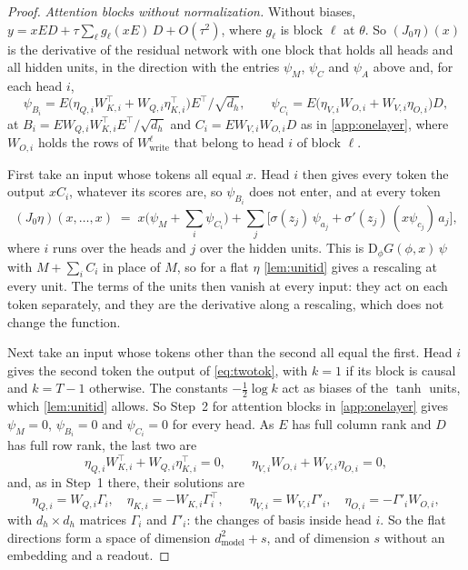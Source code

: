 \documentclass[10pt]{article}
\theoremstyle{definition}
\theoremstyle{remark}
\newcommand{\Wwrite}{W_{\mathrm{write}}}
\newcommand{\dm}{d_{\mathrm{model}}}
\newcommand{\Der}{\mathrm{D}}
\begin{document}
\begin{proof}
\emph{Attention blocks without normalization.} Without biases, $y = xED + \tau\sum_\ell g_\ell(xE)\,D + O(\tau^2)$, where $g_\ell$ is block $\ell$ at $\theta$. So $(J_0\eta)(x)$ is the derivative of the residual network with one block that holds all heads and all hidden units, in the direction with the entries $\psi_M$, $\psi_C$ and $\psi_A$ above and, for each head $i$,
\[
\psi_{B_i} = E\big(\eta_{Q,i}W_{K,i}^\top + W_{Q,i}\eta_{K,i}^\top\big)E^\top/\sqrt{d_h},\qquad \psi_{C_i} = E\big(\eta_{V,i}W_{O,i} + W_{V,i}\eta_{O,i}\big)D,
\]
at $B_i = EW_{Q,i}W_{K,i}^\top E^\top/\sqrt{d_h}$ and $C_i = EW_{V,i}W_{O,i}D$ as in \cref{app:onelayer}, where $W_{O,i}$ holds the rows of $\Wwrite^{\ell}$ that belong to head $i$ of block $\ell$.

First take an input whose tokens all equal $x$. Head $i$ then gives every token the output $xC_i$, whatever its scores are, so $\psi_{B_i}$ does not enter, and at every token
\[
(J_0\eta)(x, \dots, x) \;=\; x\Big(\psi_M + \textstyle\sum_i \psi_{C_i}\Big) + \sum_j \big[\sigma(z_j)\,\psi_{a_j} + \sigma'(z_j)\,(x\psi_{c_j})\,a_j\big],
\]
where $i$ runs over the heads and $j$ over the hidden units. This is $\Der_\phi G(\phi, x)\,\psi$ with $M + \sum_i C_i$ in place of $M$, so for a flat $\eta$ \cref{lem:unitid} gives a rescaling at every unit. The terms of the units then vanish at every input: they act on each token separately, and they are the derivative along a rescaling, which does not change the function.

Next take an input whose tokens other than the second all equal the first. Head $i$ gives the second token the output of \eqref{eq:twotok}, with $k = 1$ if its block is causal and $k = T - 1$ otherwise. The constants $-\tfrac12\log k$ act as biases of the $\tanh$ units, which \cref{lem:unitid} allows. So Step~2 for attention blocks in \cref{app:onelayer} gives $\psi_M = 0$, $\psi_{B_i} = 0$ and $\psi_{C_i} = 0$ for every head. As $E$ has full column rank and $D$ has full row rank, the last two are
\[
\eta_{Q,i}W_{K,i}^\top + W_{Q,i}\eta_{K,i}^\top = 0, \qquad \eta_{V,i}W_{O,i} + W_{V,i}\eta_{O,i} = 0,
\]
and, as in Step~1 there, their solutions are
\[
\eta_{Q,i} = W_{Q,i}\Gamma_i,\quad \eta_{K,i} = -W_{K,i}\Gamma_i^\top, \qquad \eta_{V,i} = W_{V,i}\Gamma'_i,\quad \eta_{O,i} = -\Gamma'_iW_{O,i},
\]
with $d_h\times d_h$ matrices $\Gamma_i$ and $\Gamma'_i$: the changes of basis inside head $i$. So the flat directions form a space of dimension $\dm^2 + s$, and of dimension $s$ without an embedding and a readout.


\end{proof}
\end{document}
